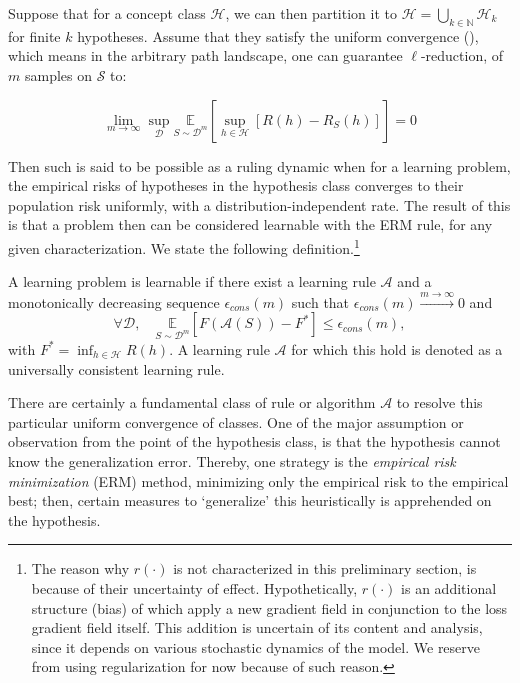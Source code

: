 \documentclass[
  journal=largetwo,
  year=2025,
  volume=37,
]{cup-journal}
\begin{document}
Suppose that for a concept class $\mathcal{H}$, we can then partition it to $\mathcal{H}=\bigcup_{k\in \mathbb{N}} \mathcal{H}_{k}$ for finite $k$ hypotheses. Assume that they satisfy the uniform convergence (\cite{JMLR:v11:shalev-shwartz10a}), which means in the arbitrary path landscape, one can guarantee $\ell$-reduction, of $m$ samples on $\mathcal{S}$ to:

\begin{equation}
    \lim_{m\to \infty} \sup_{\mathcal{D}} \underset{S\sim\mathcal{D}^{m}}{\mathbb{E}} \left[ \sup_{h\in\mathcal{H}} [R(h) - R_{S}(h)] \right] = 0
\end{equation}

Then such is said to be possible as a ruling dynamic when for a learning problem, the empirical risks of hypotheses in the hypothesis class converges to their population risk uniformly, with a distribution-independent rate. The result of this is that a problem then can be considered learnable with the ERM rule, for any given characterization. We state the following definition.\footnote{The reason why $r(\cdot)$ is not characterized in this preliminary section, is because of their uncertainty of effect. Hypothetically, $r(\cdot)$ is an additional structure (bias) of which apply a new gradient field in conjunction to the loss gradient field itself. This addition is uncertain of its content and analysis, since it depends on various stochastic dynamics of the model. We reserve from using regularization for now because of such reason.}

\begin{definition}
    A learning problem is learnable if there exist a learning rule $\mathcal{A}$ and a monotonically decreasing sequence $\epsilon_{cons}(m)$ such that $\epsilon_{cons}(m)\overset{m\to\infty}{\longrightarrow} 0$ and \begin{equation}
        \forall \mathcal{D} , \quad \underset{S\sim\mathcal{D}^{m}}{\mathbb{E}} \left[F(\mathcal{A}(S))-F^{*}\right] \leq \epsilon_{cons}(m),
    \end{equation}
    with $F^{*} = \inf_{h\in\mathcal{H}} R(h)$. A learning rule $\mathcal{A}$ for which this hold is denoted as a universally consistent learning rule. 
\end{definition}

There are certainly a fundamental class of rule or algorithm $\mathcal{A}$ to resolve this particular uniform convergence of classes. One of the major assumption or observation from the point of the hypothesis class, is that the hypothesis cannot know the generalization error. Thereby, one strategy is the \textit{empirical risk minimization} (ERM) method, minimizing only the empirical risk to the empirical best; then, certain measures to `generalize' this heuristically is apprehended on the hypothesis. 
\end{document}
